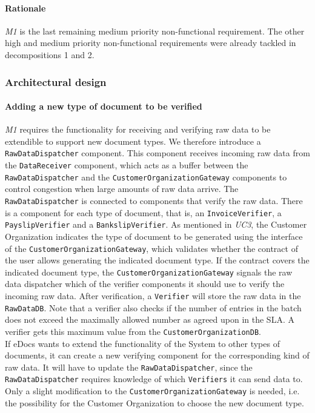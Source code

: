 \documentclass[a4paper,10pt]{article}
\begin{document}
\paragraph{Rationale} \emph{M1} is the last remaining medium priority non-functional requirement. The other high and medium priority non-functional requirements were already tackled in decompositions 1 and 2. 
\subsubsection{Architectural design}
\paragraph{Adding a new type of document to be verified} \emph{M1} requires the functionality for receiving and verifying raw data to be extendible to support new document types. We therefore introduce a \texttt{RawDataDispatcher} component. This component receives incoming raw data from the \texttt{DataReceiver} component, which acts as a buffer between the \texttt{RawDataDispatcher} and the \texttt{CustomerOrganizationGateway} components to control congestion when large amounts of raw data arrive. The \texttt{RawDataDispatcher} is connected to components that verify the raw data. There is a component for each type of document, that is, an \texttt{InvoiceVerifier}, a \texttt{PayslipVerifier} and a \texttt{BankslipVerifier}. As mentioned in \emph{UC3}, the Customer Organization indicates the type of document to be generated using the interface of the \texttt{CustomerOrganizationGateway}, which validates whether the contract of the user allows generating the indicated document type. If the contract covers the indicated document type, the \texttt{CustomerOrganizationGateway} signals the raw data dispatcher which of the verifier components it should use to verify the incoming raw data. After verification, a \texttt{Verifier} will store the raw data in the \texttt{RawDataDB}. Note that a verifier also checks if the number of entries in the batch does not exceed the maximally allowed number as agreed upon in the SLA. A verifier gets this maximum value from the \texttt{CustomerOrganizationDB}.\\

If eDocs wants to extend the functionality  of the System to other types of documents, it can create a new verifying component for the corresponding kind of raw data. It will have to update the \texttt{RawDataDispatcher}, since the \texttt{RawDataDispatcher} requires knowledge of which \texttt{Verifiers} it can send data to. Only a slight modification to the \texttt{CustomerOrganizationGateway} is needed, i.e. the possibility for the Customer Organization to choose the new document type.
\end{document}
